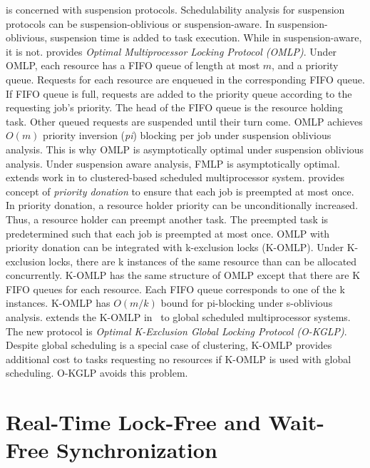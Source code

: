 \cite{key-3} is concerned with suspension protocols. Schedulability
analysis for suspension protocols can be suspension-oblivious or suspension-aware.
In suspension-oblivious, suspension time is added to task execution.
While in suspension-aware, it is not. \cite{key-3} provides \textit{Optimal
Multiprocessor Locking Protocol (OMLP)}. Under OMLP, each resource
has a FIFO queue of length at most $m$, and a priority queue. Requests
for each resource are enqueued in the corresponding FIFO queue. If
FIFO queue is full, requests are added to the priority queue according
to the requesting job's priority. The head of the FIFO queue is the
resource holding task. Other queued requests are suspended until their
turn come. OMLP achieves $O(m)$ priority inversion (\textit{pi})
blocking per job under suspension oblivious analysis. This is why
OMLP is asymptotically optimal under suspension oblivious analysis.
Under suspension aware analysis, FMLP is asymptotically optimal. \cite{6064513}
extends work in \cite{key-3} to clustered-based scheduled multiprocessor
system. \cite{6064513} provides concept of \textit{priority donation}
to ensure that each job is preempted at most once. In priority donation,
a resource holder priority can be unconditionally increased. Thus,
a resource holder can preempt another task. The preempted task is
predetermined such that each job is preempted at most once. OMLP with
priority donation can be integrated with k-exclusion locks (K-OMLP).
Under K-exclusion locks, there are k instances of the same resource
than can be allocated concurrently. K-OMLP has the same structure
of OMLP except that there are K FIFO queues for each resource. Each
FIFO queue corresponds to one of the k instances. K-OMLP has $O(m/k)$
bound for pi-blocking under s-oblivious analysis. \cite{elliott2011optimal}
extends the K-OMLP in~\cite{6064513} to global
scheduled multiprocessor systems. The new protocol is \textit{Optimal
K-Exclusion Global Locking Protocol (O-KGLP)}. Despite global scheduling
is a special case of clustering, K-OMLP provides additional cost
to tasks requesting no resources if K-OMLP is used with global scheduling.
O-KGLP avoids this problem.

\section{\label{sec:lock-free and wait-free}Real-Time Lock-Free and Wait-Free Synchronization}

